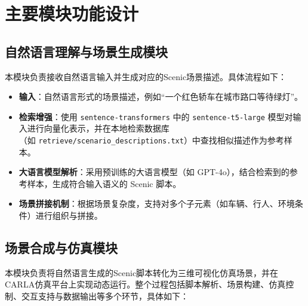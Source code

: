 \section{主要模块功能设计}
\subsection{自然语言理解与场景生成模块}
本模块负责接收自然语言输入并生成对应的Scenic场景描述。具体流程如下：
\begin{itemize}
	\item \textbf{输入}：自然语言形式的场景描述，例如“一个红色轿车在城市路口等待绿灯”。
	\item \textbf{检索增强}：使用 \texttt{sentence-transformers} 中的 \texttt{sentence-t5-large} 模型对输入进行向量化表示，并在本地检索数据库\\（如 \texttt{retrieve/scenario\_descriptions.txt}）中查找相似描述作为参考样本。
	\item \textbf{大语言模型解析}：采用预训练的大语言模型（如 GPT-4o），结合检索到的参考样本，生成符合输入语义的 Scenic 脚本。
	\item \textbf{场景拼接机制}：根据场景复杂度，支持对多个子元素（如车辆、行人、环境条件）进行组织与拼接。
\end{itemize}


\subsection{场景合成与仿真模块}

本模块负责将自然语言生成的Scenic脚本转化为三维可视化仿真场景，并在CARLA仿真平台上实现动态运行。整个过程包括脚本解析、场景构建、仿真控制、交互支持与数据输出等多个环节，具体如下：


